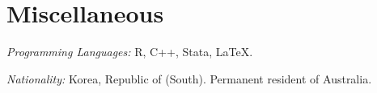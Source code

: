 \documentclass[10pt,letterpaper]{article}
\renewenvironment{itemize}{
  \begin{list}{}{
      \setlength{\leftmargin}{1.5em}
      \setlength{\itemsep}{0.25em}
      \setlength{\parskip}{0pt}
      \setlength{\parsep}{0.25em}
    }
}{
  \end{list}
}
\begin{document}

\section*{Miscellaneous}

\begin{itemize}
\item \textit{Programming Languages:} R, C++, Stata, \LaTeX.
\item \textit{Nationality:} Korea, Republic of (South). Permanent resident of Australia.
\end{itemize}

\vfill
\end{document}
